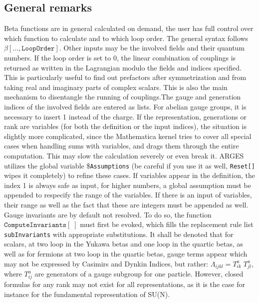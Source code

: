 \documentclass{scrartcl}
\begin{document}
\subsection{General remarks}
Beta functions are in general calculated on demand, the user has full control over which function to calculate and to which loop order. The general syntax follows $\mathtt{\beta[..., Loop Order]}$. Other inputs may be the involved fields and their quantum numbers. If the loop order is set to 0, the linear combination of couplings is returned as written in the Lagrangian modulo the fields and indices specified. This is particularly useful to find out prefactors after symmetrization and from taking real and imaginary parts of complex scalars. This is also the main mechanism to disentangle the running of couplings.\newline The gauge and generation indices of the involved fields are entered as lists. For abelian gauge groups, it is necessary to insert 1 instead of the charge. If the representation, generations or rank are variables (for both the definition or the input indices), the situation is slightly more complicated, since the Mathematica kernel tries to cover all special cases when handling sums with variables, and drags them through the entire computation. This may slow the calculation severely or even break it. ARGES utilizes the global variable \$\texttt{Assumptions} (be careful if you use it as well, \texttt{Reset[]} wipes it completely) to refine these cases. If variables appear in the definition, the index 1 is always safe as input, for higher numbers, a global assumption must be appended to respecify the range of the variables. If there is an input of variables, their range as well as the fact that these are integers must be appended as well. \newline 
Gauge invariants are by default not resolved. To do so, the function $\mathtt{ComputeInvariants[\;]}$ must first be evoked, which fills the replacement rule list \texttt{subInvariants} with appropriate substitutions. It shall be denoted that for scalars, at two loop in the Yukawa betas and one loop in the quartic betas, as well as for fermions at two loop in the quartic betas, gauge terms appear which may not be expressed by Casimirs and Dynkin Indices, but rather: $ \Lambda_{ijkl} = T ^a_{ik}\;T^a_{jl}$, where $T^a_{ij}$ are generators of a gauge subgroup for one particle. However, closed formulas for any rank may not exist for all representations, as it is the case for instance for the fundamental representation of SU(N).
\end{document}
